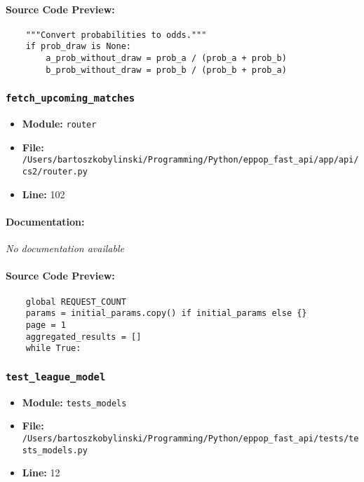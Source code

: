 \documentclass[11pt,a4paper]{article}
\begin{document}
\paragraph{Source Code Preview:}
\begin{verbatim}
    """Convert probabilities to odds."""
    if prob_draw is None:
        a_prob_without_draw = prob_a / (prob_a + prob_b)
        b_prob_without_draw = prob_b / (prob_b + prob_a)

\end{verbatim}

\vspace{1em}
\subsubsection{\texttt{fetch\_upcoming\_matches}}

\begin{itemize}
    \item \textbf{Module:} \texttt{router}
    \item \textbf{File:} \texttt{/Users/bartoszkobylinski/Programming/Python/eppop\_fast\_api/app/api/cs2/router.py}
    \item \textbf{Line:} 102
\end{itemize}

\paragraph{Documentation:} \textit{No documentation available}

\paragraph{Source Code Preview:}
\begin{verbatim}
    global REQUEST_COUNT
    params = initial_params.copy() if initial_params else {}
    page = 1
    aggregated_results = []
    while True:
\end{verbatim}

\vspace{1em}
\subsubsection{\texttt{test\_league\_model}}

\begin{itemize}
    \item \textbf{Module:} \texttt{tests\_models}
    \item \textbf{File:} \texttt{/Users/bartoszkobylinski/Programming/Python/eppop\_fast\_api/tests/tests\_models.py}
    \item \textbf{Line:} 12
\end{itemize}
\end{document}
